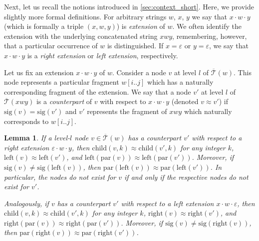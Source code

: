 \documentclass[a4paper]{article}
\newtheorem{lemma}[theorem]{Lemma}
\theoremstyle{remark}
\newcommand{\ustree}{\mathcal{\overline{T}}}
\newcommand{\uspar}{\mathrm{par}}
\newcommand{\usleft}{\mathrm{left}}
\newcommand{\usright}{\mathrm{right}}
\newcommand{\uschild}{\mathrm{child}}
\newcommand{\ussig}{\mathrm{sig}}
\newcommand{\eps}{\varepsilon}
\newcommand{\edot}{{\cdot}}
\begin{document}
Next, let us recall the notions introduced in \cref{sec:context_short}. Here, we provide slightly more formal definitions.
For arbitrary strings $w$, $x$, $y$ we say that $x\edot w\edot y$ (which is formally a triple $(x,w,y)$)
is \emph{extension} of $w$. We often identify the extension with the underlying concatenated string $xwy$,
remembering, however, that a particular occurrence of $w$ is distinguished.
If $x=\eps$ or $y=\eps$, we say that $x\edot w\edot y$ is a \emph{right extension} or \emph{left extension}, respectively.

Let us fix an extension $x\edot w \edot y$ of $w$. Consider a node $v$ at level $l$ of $\ustree(w)$.
This node represents a particular fragment $w[i..j]$ which has a naturally corresponding fragment of the extension.
We say that a node $v'$ at level $l$ of $\ustree(xwy)$ is a \emph{counterpart} of $v$ with respect to $x\edot w \edot y$
(denoted $v \approx v'$) if $\ussig(v)=\ussig(v')$ and $v'$ represents the fragment of $xwy$ which naturally corresponds to $w[i..j]$.

\begin{lemma}\label{lem:close}
If a level-$l$ node $v\in \ustree(w)$ has a counterpart $v'$ with respect to a right extension $\eps \edot w \edot y$,
then $\uschild(v,k)\approx \uschild(v',k)$ for any integer $k$, $\usleft(v)\approx \usleft(v')$, and $\usleft(\uspar(v))\approx \usleft(\uspar(v'))$.
Moreover, if $\ussig(v)\ne \ussig(\usleft(v))$, then $\uspar(\usleft(v))\approx \uspar(\usleft(v'))$.
In particular, the nodes do not exist for $v$ if and only if the respective nodes do not exist for $v'$.


Analogously, if $v$ has a counterpart $v'$ with respect to a left extension  $x \edot w \edot \eps$,
then $\uschild(v,k)\approx \uschild(v',k)$ for any integer $k$, $\usright(v)\approx \usright(v')$, and $\usright(\uspar(v))\approx \usright(\uspar(v'))$.
Moreover, if $\ussig(v)\ne \ussig(\usright(v))$, then $\uspar(\usright(v))\approx \uspar(\usright(v'))$.
\end{lemma}
\end{document}
